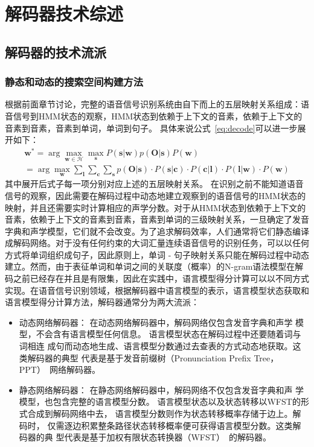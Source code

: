 \section{解码器技术综述}
\label{chap:intro2-dec-sum}

\subsection{解码器的技术流派}
\label{chap:intro-lvcsr-decmethod}

\subsubsection{静态和动态的搜索空间构建方法}
\label{chap:intro-lvcsr-decmethod-graph}

根据前面章节讨论，完整的语音信号识别系统由自下而上的五层映射关系组成：语音信号到HMM状态的观察，HMM状态到依赖于上下文的音素，依赖于上下文的音素到音素，音素到单词，单词到句子。
具体来说公式~\ref{eq:decode}可以进一步展开如下：
\begin{equation}
 \begin{split}
\mathbf{w}^* = \arg \max_{\mathbf{w} \in \mathcal{H}} \max_{\mathbf{s}} P(\mathbf{s}|\mathbf{w})p(\mathbf{O}|\mathbf{s})P(\mathbf{w}) \\
= \arg \max_{\mathbf{w}} \sum_{\mathbf{l}} \sum_{\mathbf{c}} \sum_{\mathbf{s}}
p(\mathbf{O}|\mathbf{s}) \cdot
P(\mathbf{s}|\mathbf{c})\cdot P(\mathbf{c}|\mathbf{l})\cdot P(\mathbf{l}|\mathbf{w}) \cdot 
P(\mathbf{w})
 \end{split}
\end{equation}
其中展开后式子每一项分别对应上述的五层映射关系。
在识别之前不能知道语音信号的观察，因此需要在解码过程中动态地建立观察到的语音信号的HMM状态的映射，并且还需要实时计算相应的声学分数。对于从HMM状态到依赖于上下文的音素，依赖于上下文的音素到音素，音素到单词的三级映射关系，一旦确定了发音字典和声学模型，它们就不会改变。为了追求解码效率，人们通常将它们静态编译成解码网络。对于没有任何约束的大词汇量连续语音信号的识别任务，可以以任何方式将单词组织成句子，因此原则上，单词 - 句子映射关系只能在解码过程中动态建立。然而，由于表征单词和单词之间的关联度（概率）的N-gram语法模型在解码之前已经存在并且是有限集，因此在实践中，语言模型得分计算可以以不同方式实现。在语音信号识别领域，根据解码器中语言模型的表示，语言模型状态获取和语言模型得分计算方法，解码器通常分为两大流派：
\begin{itemize}
\item 动态网络解码器： 在动态网络解码器中，解码网络仅包含发音字典和声学
模型，不会含有语言模型任何信息。 语言模型状态在解码过程中还要随着词与词相连
成句而动态地生成、语言模型分数通过去查表的方式动态地获取。这类解码器的典型
代表是基于发音前缀树（Pronunciation Prefix Tree， PPT）~\cite{woodland1994large}网络解码器。
\item 静态网络解码器： 在静态网络解码器中，解码网络不仅包含发音字典和声
学模型，也包含完整的语言模型分数。 语言模型状态以及状态转移以WFST的形
式合成到解码网络中去， 语言模型分数则作为状态转移概率存储于边上。解码时，
仅需逐边积累整条路径状态转移概率便可获得语言模型分数。这类解码器的典
型代表是基于加权有限状态转换器（WFST）~\cite{mohri2002weighted}的解码器。
\end{itemize}

